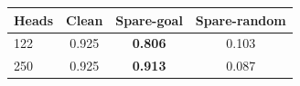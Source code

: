 \begin{tabular}{lccc}
\toprule
Heads & Clean & Spare-goal & Spare-random \\
\midrule
122 & 0.925 & \textbf{0.806} & 0.103 \\
250 & 0.925 & \textbf{0.913} & 0.087 \\
\bottomrule
\end{tabular}
